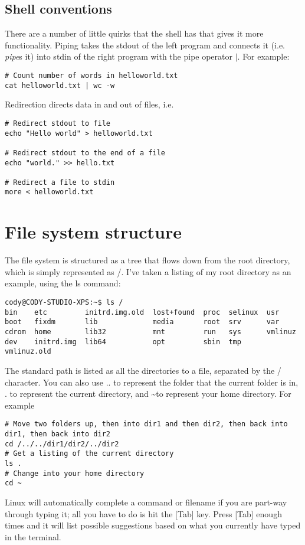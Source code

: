 \documentclass{article}
\begin{document}
\subsection{Shell conventions}
There are a number of little quirks that the shell has that gives it more functionality.
Piping takes the stdout of the left program and connects it (i.e. \emph{pipe}s it) into stdin of the right program with the pipe operator $|$. For example:
\begin{verbatim}
# Count number of words in helloworld.txt
cat helloworld.txt | wc -w 
\end{verbatim}
Redirection directs data in and out of files, i.e. 
\begin{verbatim}
# Redirect stdout to file
echo "Hello world" > helloworld.txt

# Redirect stdout to the end of a file
echo "world." >> hello.txt

# Redirect a file to stdin
more < helloworld.txt
\end{verbatim}

\section{File system structure}
The file system is structured as a tree that flows down from the root directory, which is simply represented as /. I've taken a listing of my root directory as an example, using the ls command:
\begin{verbatim}
cody@CODY-STUDIO-XPS:~$ ls /
bin    etc         initrd.img.old  lost+found  proc  selinux  usr
boot   fixdm       lib             media       root  srv      var
cdrom  home        lib32           mnt         run   sys      vmlinuz
dev    initrd.img  lib64           opt         sbin  tmp      vmlinuz.old
\end{verbatim}
The standard path is listed as all the directories to a file, separated by the / character.
You can also use .. to represent the folder that the current folder is in, . to represent the current directory, and \textasciitilde to represent your home directory. For example
\begin{verbatim}
# Move two folders up, then into dir1 and then dir2, then back into dir1, then back into dir2
cd /../../dir1/dir2/../dir2
# Get a listing of the current directory
ls .
# Change into your home directory
cd ~
\end{verbatim}
Linux will automatically complete a command or filename if you are part-way through typing it; all you have to do is hit the [Tab] key. Press [Tab] enough times and it will list possible suggestions based on what you currently have typed in the terminal.
\end{document}
